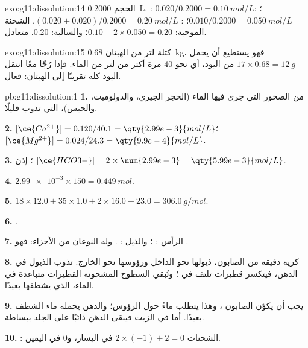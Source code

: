 \begin{solution}{exo:g11:dissolution:14}
الحجم \qty{0.2000}{L}. : $0.020 / 0.2000 = \qty{0.10}{mol/L}$؛
: $0.010 / 0.2000 = \qty{0.050}{mol/L}$؛ :
$(0.020 + 0.020) / 0.2000 = \qty{0.20}{mol/L}$. الشحنة الموجبة:
$0.10 + 2 \times 0.050 = 0.20$؛ والسالبة: $0.20$. متعادل.
\end{solution}

\begin{solution}{exo:g11:dissolution:15}
كتلة لتر من الهبتان \qty{0.68}{kg}، فهو يستطيع أن يحمل
$17 \times 0.68 = \qty{12}{g}$ من اليود، أي نحو 40 مرة أكثر من
لتر من الماء. فإذا رُجّا معًا انتقل اليود كله تقريبًا إلى
الهبتان:  فعال.
\end{solution}

\begin{solution}{pb:g11:dissolution:1}
\textbf{1.} من الصخور التي جرى فيها الماء (الحجر الجيري،
والدولوميت، والجبس)، التي تذوب قليلًا.

\textbf{2.} $[\ce{Ca^{2+}}] = 0.120 / 40.1 = \qty{2.99e-3}{mol/L}$؛
$[\ce{Mg^{2+}}] = 0.024 / 24.3 = \qty{9.9e-4}{mol/L}$.

\textbf{3.} ؛ إذن
$[\ce{HCO3-}] = 2 \times \num{2.99e-3} = \qty{5.99e-3}{mol/L}$.

\textbf{4.} $\num{2.99e-3} \times 150 = \qty{0.449}{mol}$.

\textbf{5.} $18 \times 12.0 + 35 \times 1.0 + 2 \times 16.0 + 23.0 =
\qty{306.0}{g/mol}$.

\textbf{6.} .

\textbf{7.} الرأس : ؛ والذيل :
. وله النوعان من الأجزاء: فهو .

\textbf{8.} كرية دقيقة من  الصابون، ذيولها نحو الداخل ورؤوسها نحو الخارج.
تذوب الذيول في الدهن، فيتكسر قطيرات تلتف في
؛ وتُبقي السطوح المشحونة القطيرات متباعدة في الماء،
الذي يشطفها بعيدًا.

\textbf{9.} يجب أن يكوّن الصابون  ، وهذا يتطلب ماءً
حول الرؤوس؛ والدهن يحمله ماء الشطف بعيدًا. أما في
الزيت فيبقى الدهن ذائبًا على الجلد ببساطة.

\textbf{10.} : الشحنات
$2 \times (-1) + 2 = 0$ في اليسار، و$0$ في اليمين.


\end{solution}
